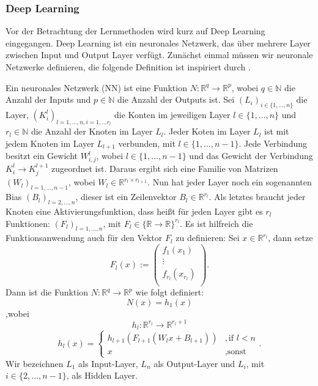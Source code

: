 \documentclass[12pt,letterpaper,ngerman]{article}
\begin{document}
\subsubsection{Deep Learning}
Vor der Betrachtung der Lernmethoden wird kurz auf Deep Learning eingegangen.
Deep Learning ist ein neuronales Netzwerk, das über mehrere Layer zwischen
Input und Output Layer verfügt.  
Zunächst einmal müssen wir neuronale Netzwerke definieren, die folgende
 Definition ist inspiriert durch \cite{Kruse2022}. 

\begin{definition}
  Ein neuronales Netzwerk (NN) ist eine Funktion $N: \mathbb{R}^q \to \mathbb{R}^p$,
  wobei $q\in \mathbb{N}$ die Anzahl der Inputs und $p \in \mathbb{N}$ die
  Anzahl der Outputs ist. Sei $(L_i)_{i \in \{ 1, \dots, n\}}$ die Layer,
  $(K_i^l)_{l=1,\dots, n, i = 1,\dots r_l}$ die Konten im jeweiligen Layer 
  $l \in \{1, \dots, n\}$ und $r_l \in \mathbb{N}$ die Anzahl der Knoten im
  Layer $L_l$. Jeder Koten im Layer $L_l$ ist mit jedem Knoten im 
  Layer $L_{l+1}$ verbunden, mit $l \in \{1,\dots, n-1\}$. Jede Verbindung
  besitzt ein Gewicht $W_{i,j}^l$, wobei $l \in \{1,\dots, n-1\}$ und 
  das Gewicht der Verbindung $K^l_i \to K^{l+1}_j$ zugeordnet ist.
  Daraus ergibt sich eine Familie von Matrizen 
  $(W_l)_{l=1,\dots, n-1}$, wobei $ W_l\in \mathbb{R}^{r_l\times r_{l+1}}$.
  Nun hat jeder Layer noch ein sogenannten Bias $(B_l)_{l = 2,\dots,n}$,
  dieser ist ein Zeilenvektor $B_l \in \mathbb{R}^{r_l}$.
  Als letztes braucht jeder Knoten eine Aktivierungsfunktion, dass heißt
  für jeden Layer gibt es $r_l$ Funktionen:
  $(F_l)_{l=1,\dots,n}$, mit $F_l \in \{\mathbb{R} \to \mathbb{R}\}^{r_l}$.
  Es ist hilfreich die Funktionsanwendung auch für den Vektor $F_l$ zu definieren:
  Sei $x \in \mathbb{R}^{r_l}$, dann setze
  \[
    F_l(x) := \begin{pmatrix} 
        f_1(x_1) \\
        \vdots\\
        f_{r_l}(x_{r_l})\\
    \end{pmatrix}.
  \]
  Dann ist die Funktion $N: \mathbb{R}^q \to \mathbb{R}^p$ wie folgt definiert:
  \[
    N(x) = h_1(x)
  \]
  ,wobei
  \[h_l: \mathbb{R}^{r_l} \to \mathbb{R}^{r_l+1}\]
  \[
    h_l(x) = 
      \begin{cases}
        h_{l+1}(F_{l+1}(W_lx + B_{l+1}))& ,  \text{if } l < n  \\
        x & , \text{sonst}
      \end{cases}.
  \]
  Wir bezeichnen $L_1$ als Input-Layer, $L_n$ als Output-Layer und
  $L_i$, mit $i \in \{2, \dots, n-1\}$, als Hidden Layer.
\end{definition}
\end{document}
